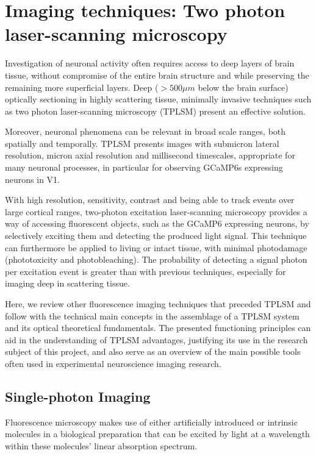 \section{Imaging techniques: Two photon laser-scanning microscopy}
\label{sec:sectionc}

Investigation of neuronal activity often requires access to deep layers of brain tissue, without compromise of the entire brain structure and while preserving the remaining more superficial layers. Deep ($>500 \mu m$ below the brain surface) optically sectioning in highly scattering tissue, minimally invasive techniques such as two photon laser-scanning microscopy (TPLSM) present an effective solution. 

Moreover, neuronal phenomena can be relevant in broad scale ranges, both spatially and temporally. TPLSM presents images with submicron lateral resolution, micron axial resolution and millisecond timescales, appropriate for many neuronal processes, in particular for observing GCaMP6s expressing neurons in V1.

With high resolution, sensitivity, contrast and being able to track events over large cortical ranges, two-photon excitation laser-scanning microscopy provides a way of accessing fluorescent objects, such as the GCaMP6 expressing neurons, by selectively exciting them and detecting the produced light signal. This technique can furthermore be applied to living or intact tissue, with minimal photodamage (phototoxicity and photobleaching). The probability of detecting a signal photon per excitation event is greater than with previous techniques, especially for imaging deep in scattering tissue.

Here, we review other fluorescence imaging techniques that preceded TPLSM and follow with the technical main concepts in the assemblage of a TPLSM system and its optical theoretical fundamentals. The presented functioning principles can aid in the understanding of TPLSM advantages, justifying its use in the research subject of this project, and also serve as an overview of the main possible tools often used in experimental neuroscience imaging research.


\subsection{Single-photon Imaging}

Fluorescence microscopy makes use of either artificially introduced or intrinsic molecules in a biological preparation that can be excited by light at a wavelength within these molecules' linear absorption spectrum.


